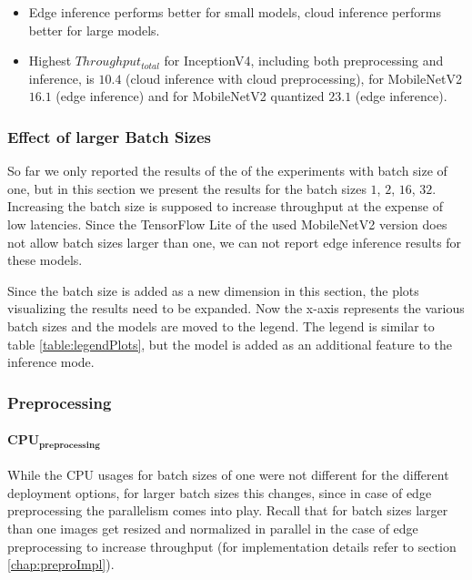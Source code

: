 {\begin{itemize}
\end{itemize}
\begin{itemize}[leftmargin=4em]
 \renewcommand{\labelitemi}{$\Rightarrow$}
 \item Edge inference performs better for small models, cloud inference performs better for large models.
 \item Highest $Throughput_{total}$ for InceptionV4, including both preprocessing and inference, is $10.4$ (cloud inference with cloud preprocessing), for MobileNetV2 $16.1$ (edge inference) and for MobileNetV2 quantized $23.1$ (edge inference).
\end{itemize}
}

\subsubsection{Effect of larger Batch Sizes}
\label{chap:resultsBatchSize}
So far we only reported the results of the of the experiments with batch size of one, but in this section we present the results for the batch sizes $1$, $2$, $16$, $32$.
Increasing the batch size  is supposed to increase throughput at the expense of low latencies.
Since the TensorFlow Lite of the used MobileNetV2 version does not allow batch sizes larger than one, we can not report edge inference results for these models.

Since the batch size is added as a new dimension in this section, the plots visualizing the results need to be expanded.
Now the x-axis represents the various batch sizes and the models are moved to the legend. 
The legend is similar to table \ref{table:legendPlots}, but the model is added as an additional feature to the inference mode.
\subsubsection{Preprocessing}

\paragraph{$\mathbf{CPU_{preprocessing}}$}
While the CPU usages for batch sizes of one were not different for the different deployment options, for larger batch sizes this changes, since in case of edge preprocessing the parallelism comes into play.
Recall that for batch sizes larger than one images get resized and normalized in parallel in the case of edge preprocessing to increase throughput (for implementation details refer to section \ref{chap:preproImpl}).


